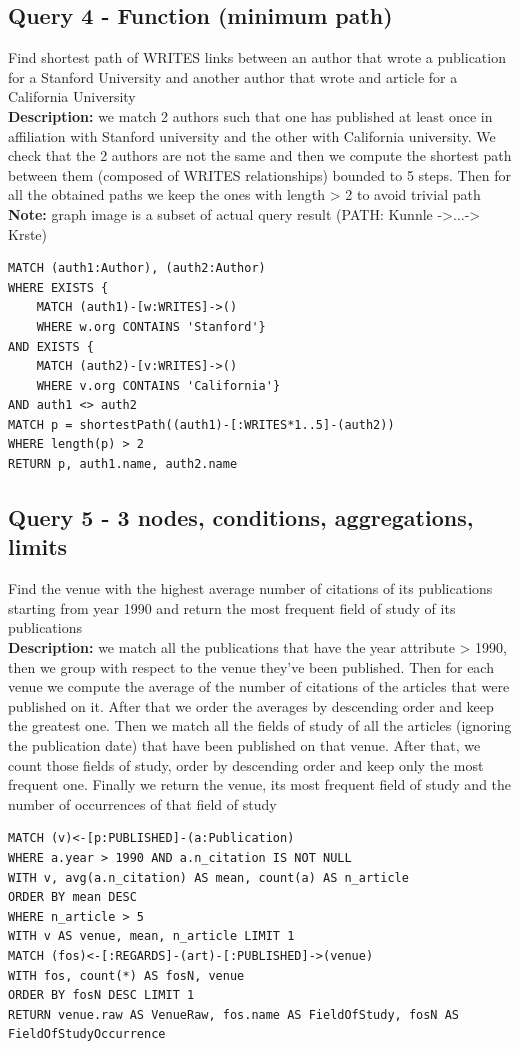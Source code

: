 \documentclass{Configuration_Files/PoliMi3i_thesis}
\begin{document}
\subsection{Query 4 - Function (minimum path)}
Find shortest path of WRITES links between an author that wrote a publication for a Stanford University and another author
that wrote and article for a California University\\
\textbf{Description:} we match 2 authors such that one has published at least once in affiliation with Stanford university and the other with California university.
We check that the 2 authors are not the same and then we compute the shortest path between them (composed of WRITES relationships) bounded to 5 steps.
Then for all the obtained paths we keep the ones with length > 2 to avoid trivial path\\
\textbf{Note:} graph image is a subset of actual query result (PATH: Kunnle ->...-> Krste)
\begin{lstlisting}[language=cypher, label=lst:cypher-example]
MATCH (auth1:Author), (auth2:Author)
WHERE EXISTS {
    MATCH (auth1)-[w:WRITES]->()
    WHERE w.org CONTAINS 'Stanford'}
AND EXISTS {
    MATCH (auth2)-[v:WRITES]->()
    WHERE v.org CONTAINS 'California'}
AND auth1 <> auth2
MATCH p = shortestPath((auth1)-[:WRITES*1..5]-(auth2))
WHERE length(p) > 2
RETURN p, auth1.name, auth2.name
\end{lstlisting}

\subsection{Query 5 - 3 nodes, conditions, aggregations, limits}
Find the venue with the highest average number of citations of its publications starting from year 1990 and return the most frequent field of study of its publications\\
\textbf{Description:} we match all the publications that have the year attribute > 1990, then we group with respect to the venue they've been published.
Then for each venue we compute the average of the number of citations of the articles that were published on it.
After that we order the averages by descending order and keep the greatest one. Then we match all the fields of study of all the articles (ignoring the publication date)
that have been published on that venue. After that, we count those fields of study, order by descending order and keep only the most frequent one.
Finally we return the venue, its most frequent field of study and the number of occurrences of that field of study
\begin{lstlisting}[language=cypher, label=lst:cypher-example]
MATCH (v)<-[p:PUBLISHED]-(a:Publication)
WHERE a.year > 1990 AND a.n_citation IS NOT NULL
WITH v, avg(a.n_citation) AS mean, count(a) AS n_article
ORDER BY mean DESC
WHERE n_article > 5
WITH v AS venue, mean, n_article LIMIT 1
MATCH (fos)<-[:REGARDS]-(art)-[:PUBLISHED]->(venue)
WITH fos, count(*) AS fosN, venue
ORDER BY fosN DESC LIMIT 1
RETURN venue.raw AS VenueRaw, fos.name AS FieldOfStudy, fosN AS FieldOfStudyOccurrence
\end{lstlisting}
\end{document}
